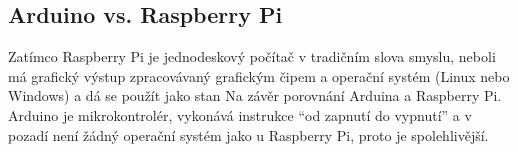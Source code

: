 
\subsection{Arduino vs. Raspberry Pi}
Zatímco Raspberry Pi je jednodeskový počítač v tradičním slova smyslu, neboli má grafický výstup zpracovávaný grafickým čipem a operační systém (Linux nebo Windows) a dá se použít jako stan
Na závěr porovnání Arduina a Raspberry Pi. Arduino je mikrokontrolér, vykonává instrukce “od zapnutí do vypnutí” a v pozadí není žádný operační systém jako u Raspberry Pi, proto je spolehlivější.